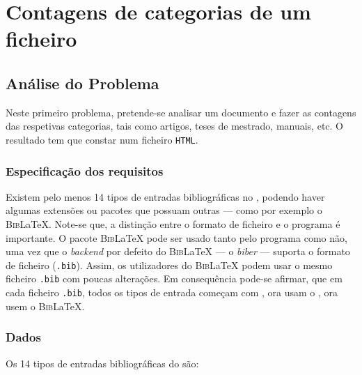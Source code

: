\chapter{Contagens de categorias de um ficheiro }
\label{chap:a}

\section{Análise do Problema}
Neste primeiro problema, pretende-se analisar um documento  e fazer as
contagens das respetivas categorias, tais como artigos, teses de mestrado,
manuais, etc. O resultado tem que constar num ficheiro \texttt{HTML}.


\label{sec:ap:a}

\subsection{Especificação dos requisitos}
\label{sec:spec:a}
Existem pelo menos 14 tipos de entradas bibliográficas no ,
podendo haver algumas extensões ou pacotes que possuam outras --- como por exemplo
o \textsc{Bib}\LaTeX{}.
Note-se que, a distinção entre o formato de ficheiro 
e o programa  é importante. O pacote \textsc{Bib}\LaTeX{} pode
ser usado tanto pelo programa  como não, uma vez que
o \emph{backend} por defeito do \textsc{Bib}\LaTeX{} --- o \emph{biber} ---
suporta o formato de ficheiro  (\texttt{.bib}). Assim, os
utilizadores do \textsc{Bib}\LaTeX{} podem usar o mesmo ficheiro \texttt{.bib} com
poucas alterações. Em consequência pode-se afirmar, que em cada ficheiro
\texttt{.bib}, todos os tipos de entrada começam com \emph{\@}, ora usam
o , ora usem o \textsc{Bib}\LaTeX.


\subsection{Dados}

Os 14 tipos de entradas bibliográficas do  são:

